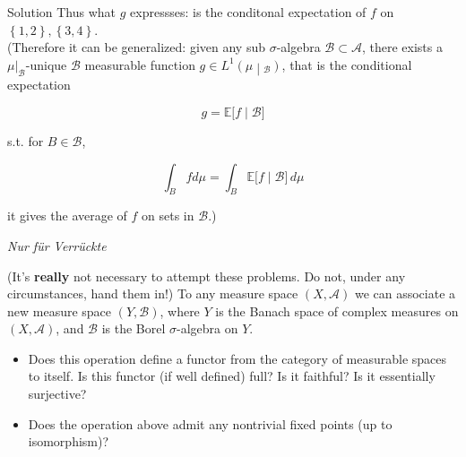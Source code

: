 \documentclass{qlnotes-export}
\begin{document}
\begin{qlsolution}{Solution}
Thus what \(g\) expressses: is the conditonal expectation of \(f\) on \(\left\{ {1,2} \right\},\left\{ {3,4} \right\}\).\\
(Therefore it can be generalized: given any sub \(\sigma\)-algebra \(\mathcal{B} \subset \mathcal{A}\), there exists a \(\mu|_{\mathcal{B}}\)-unique \(\mathcal{B}\) measurable function \(\left. g \in L^{1}(\mu \middle| {}_{\mathcal{B}}) \right.\), that is the conditional expectation

\[g = {\mathbb{E}}\lbrack f \mid \mathcal{B}\rbrack\]

s.t. for \(B \in \mathcal{B}\),

\[\int_{B}fd\mu = \int_{B}{\mathbb{E}}\lbrack f \mid \mathcal{B}\rbrack\, d\mu\]

it gives the average of \(f\) on sets in \(\mathcal{B}\).)

\end{qlsolution}

\emph{Nur für Verrückte}

(It's \textbf{really} not necessary to attempt these problems. Do not, under any circumstances, hand them in!) To any measure space \((X,\mathcal{A})\) we can associate a new measure space \((Y,\mathcal{B})\), where \(Y\) is the Banach space of complex measures on \((X,\mathcal{A})\), and \(\mathcal{B}\) is the Borel \(\sigma\)-algebra on \(Y\).

\begin{itemize}
\item
  Does this operation define a functor from the category of measurable spaces to itself. Is this functor (if well defined) full? Is it faithful? Is it essentially surjective?
\item
  Does the operation above admit any nontrivial fixed points (up to isomorphism)?
\end{itemize}
\end{document}
